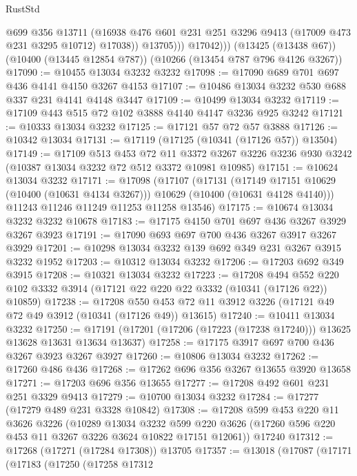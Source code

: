 \begin{lexlean}{RustStd}
\begin{coremodule}
                  @699
                  @356
                  @13711
                  (@16938 @476 @601 @231 @251 @3296 @9413 (@17009 @473 @231 @3295 @10712) @17038))
                @13705)))
          @17042)))
    (@13425 (@13438 @67))
    (@10400 (@13445 @12854 @787))
    (@10266 (@13454 @787 @796 @4126 @3267))
@17090 := @10455 @13034 @3232 @3232
@17098 := @17090 @689 @701 @697 @436 @4141 @4150 @3267 @4153
@17107 := @10486 @13034 @3232 @530 @688 @337 @231 @4141 @4148 @3447
@17109 := @10499 @13034 @3232
@17119 := @17109 @443 @515 @72 @102 @3888 @4140 @4147 @3236 @925 @3242
@17121 := @10333 @13034 @3232
@17125 := @17121 @57 @72 @57 @3888
@17126 := @10342 @13034
@17131 := @17119 (@17125 (@10341 (@17126 @57)) @13504)
@17149 := @17109
    @513
    @453
    @72
    @11
    @3372
    @3267
    @3226
    @3236
    @930
    @3242
    (@10387 @13034 @3232 @72 @512 @3372 @10981 @10985)
@17151 := @10624 @13034 @3232
@17171 := @17098
    (@17107
      (@17131
        (@17149 @17151 @10629 (@10400 (@10631 @4134 @3267)))
        @10629
        (@10400 (@10631 @4128 @4140)))
      @11243
      @11246
      @11249
      @11253
      @11258
      @13546)
@17175 := @10674 @13034 @3232 @3232 @10678
@17183 := @17175 @4150 @701 @697 @436 @3267 @3929 @3267 @3923
@17191 := @17090 @693 @697 @700 @436 @3267 @3917 @3267 @3929
@17201 := @10298 @13034 @3232 @139 @692 @349 @231 @3267 @3915 @3232 @1952
@17203 := @10312 @13034 @3232
@17206 := @17203 @692 @349 @3915
@17208 := @10321 @13034 @3232
@17223 := @17208
    @494
    @552
    @220
    @102
    @3332
    @3914
    (@17121 @22 @220 @22 @3332 (@10341 (@17126 @22)) @10859)
@17238 := @17208
    @550
    @453
    @72
    @11
    @3912
    @3226
    (@17121 @49 @72 @49 @3912 (@10341 (@17126 @49)) @13615)
@17240 := @10411 @13034 @3232
@17250 := @17191 (@17201 (@17206 (@17223 (@17238 @17240))) @13625 @13628 @13631 @13634 @13637)
@17258 := @17175 @3917 @697 @700 @436 @3267 @3923 @3267 @3927
@17260 := @10806 @13034 @3232
@17262 := @17260 @486 @436
@17268 := @17262 @696 @356 @3267 @13655 @3920 @13658
@17271 := @17203 @696 @356 @13655
@17277 := @17208 @492 @601 @231 @251 @3329 @9413
@17279 := @10700 @13034 @3232
@17284 := @17277 (@17279 @489 @231 @3328 @10842)
@17308 := @17208
    @599
    @453
    @220
    @11
    @3626
    @3226
    (@10289
      @13034
      @3232
      @599
      @220
      @3626
      (@17260 @596 @220 @453 @11 @3267 @3226 @3624 @10822 @17151 @12061))
    @17240
@17312 := @17268 (@17271 (@17284 @17308)) @13705
@17357 := @13018
    (@17087
      (@17171
        (@17183
          (@17250
            (@17258
              @17312

\end{coremodule}
\end{lexlean}
